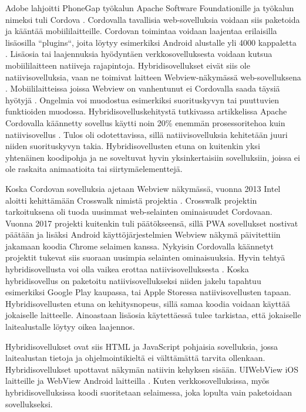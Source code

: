 \documentclass{tktltiki}
\begin{document}
Adobe lahjoitti PhoneGap työkalun Apache Software Foundationille ja työkalun nimeksi tuli Cordova \cite{Tung}. Cordovalla tavallisia web-sovelluksia voidaan siis paketoida ja kääntää mobiililaitteille. Cordovan toimintaa voidaan laajentaa erilaisilla lisäosilla “plugins“, joita löytyy esimerkiksi Android alustalle yli 4000 kappaletta \cite{Cordova}. Lisäosia tai laajennuksia hyödyntäen verkkosovelluksesta voidaan kutsua mobiililaitteen natiiveja rajapintoja. Hybridisovellukset eivät siis ole natiivisovelluksia, vaan ne toimivat laitteen Webview-näkymässä web-sovelluksena \cite{bosnic2016development}. Mobiililaitteissa joissa Webview on vanhentunut ei Cordovalla saada täysiä hyötyjä \cite{bosnic2016development}. Ongelmia voi muodostua esimerkiksi suorituskyvyn tai puuttuvien funktioiden muodossa. Hybridisovelluskehitystä tutkivassa artikkelissa Apache Cordovalla käännetty sovellus käytti noin 20\% enemmän prosessoritehoa kuin natiivisovellus \cite{bosnic2016development}. Tulos oli odotettavissa, sillä natiivisovelluksia kehitetään juuri niiden suorituskyvyn takia. Hybridisovellusten etuna on kuitenkin yksi yhtenäinen koodipohja ja ne soveltuvat hyvin yksinkertaisiin sovelluksiin, joissa ei ole raskaita animaatioita tai siirtymäelementtejä. 

Koska Cordovan sovelluksia ajetaan Webview näkymässä, vuonna 2013 Intel aloitti kehittämään Crosswalk nimistä projektia \cite{Crosswalk}. Crosswalk projektin tarkoituksena oli tuoda uusimmat web-selainten ominaisuudet Cordovaan. Vuonna 2017 projekti kuitenkin tuli päätökseensä, sillä PWA sovellukset nostivat päätään ja lisäksi Android käyttöjärjestelmien Webview näkymä päivitettiin jakamaan koodia Chrome selaimen kanssa. Nykyisin Cordovalla käännetyt projektit tukevat siis suoraan uusimpia selainten ominaisuuksia. Hyvin tehtyä hybridisovellusta voi olla vaikea erottaa natiivisovelluksesta \cite{Haikonen}. Koska hybridisovellus on paketoitu natiivisovellukseksi niiden jakelu tapahtuu esimerkiksi Google Play kaupassa, tai Apple Storessa natiivisovellusten tapaan. Hybridisovellusten etuna on kehitysnopeus, sillä samaa koodia voidaan käyttää jokaiselle laitteelle. Ainoastaan lisäosia käytettäessä tulee tarkistaa, että jokaiselle laitealustalle löytyy oikea laajennos. 

Hybridisovellukset ovat siis HTML ja JavaScript pohjaisia sovelluksia, jossa laitealustan tietoja ja ohjelmointikieltä ei välttämättä tarvita ollenkaan. Hybridisovellukset upottavat näkymän natiivin kehyksen sisään. UIWebView iOS laitteille ja WebView Android laitteilla \cite{xanthopoulos2013comparative}. Kuten verkkosovelluksissa, myös hybridisovelluksissa koodi suoritetaan selaimessa, joka lopulta vain paketoidaan sovellukseksi. 
\end{document}
